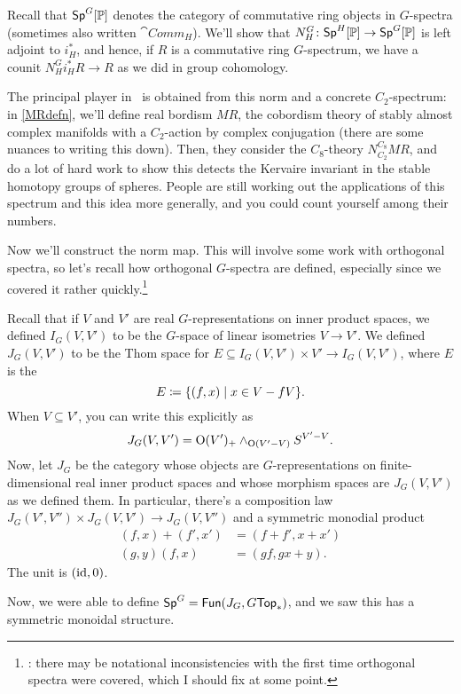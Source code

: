 Recall that $\mathsf{Sp}^G[\mathbb P]$ denotes the category of commutative ring objects in $G$-spectra (sometimes also written $\cat{Comm}_H$). We'll show that $N_H^G\colon\mathsf{Sp}^H[\mathbb P]\to\mathsf{Sp}^G[\mathbb P]$ is left
adjoint to $i^*_H$, and hence, if $R$ is a commutative ring $G$-spectrum, we have a counit $N_H^Gi_H^*R\to R$ as we
did in group cohomology.

The principal player in~\cite{HHR} is obtained from this norm and a concrete $C_2$-spectrum: in \cref{MRdefn},
we'll define real bordism $\mathit{MR}$, the cobordism theory of stably almost complex
manifolds with a $C_2$-action by complex conjugation (there are some nuances to writing this down). Then, they
consider the $C_8$-theory $N_{C_2}^{C_8}\mathit{MR}$, and do a lot of hard work to show this detects the Kervaire
invariant in the stable homotopy groups of spheres. People are still working out the applications of this spectrum
and this idea more generally, and you could count yourself among their numbers.

Now we'll construct the norm map. This will involve some work with orthogonal spectra, so let's recall how
orthogonal $G$-spectra are defined, especially since we covered it rather quickly.\footnote{\TODO: there may be
notational inconsistencies with the first time orthogonal spectra were covered, which I should fix at some
point.}

Recall that if $V$ and $V'$ are real $G$-representations on inner product spaces, we defined $I_G(V,V')$ to be the
$G$-space of linear isometries $V\to V'$. We defined $J_G(V,V')$ to be the Thom space for $E\subseteq
I_G(V,V')\times V'\to I_G(V,V')$, where $E$ is the 
\[E \coloneqq \{(f,x)\mid x \in V - fV\}.\]
When $V\subseteq V'$, you can write this explicitly as
\[J_G(V,V') = \mathrm O(V')_+\wedge_{\mathrm O(V' - V)} S^{V' - V}.\]
Now, let $J_G$ be the category whose objects are $G$-representations on finite-dimensional real inner product
spaces and whose morphism spaces are $J_G(V,V')$ as we defined them. In particular, there's a composition law
$J_G(V',V'')\times J_G(V,V')\to J_G(V, V'')$ and a symmetric monodial product
\begin{align*}
	(f,x) + (f',x') &= (f+f', x+x')\\
	(g,y)(f,x) &= (gf, gx+y).
\end{align*}
The unit is $(\mathrm{id},0)$.

Now, we were able to define $\mathsf{Sp}^G = \mathsf{Fun}(J_G, G\mathsf{Top}_*)$, and we saw this has a symmetric monoidal structure.

